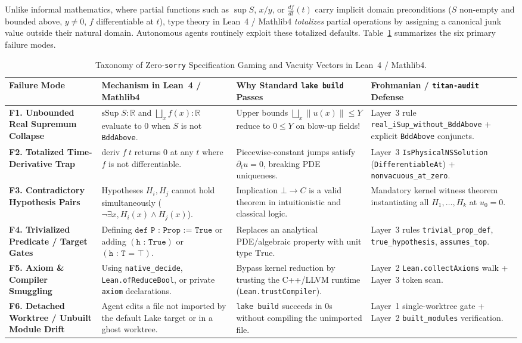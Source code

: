 \documentclass[11pt,a4paper]{article}
\theoremstyle{plain}
\theoremstyle{definition}
\begin{document}
Unlike informal mathematics, where partial functions such as $\sup S$, $x/y$, or $\frac{df}{dt}(t)$ carry implicit domain preconditions ($S$ non-empty and bounded above, $y \ne 0$, $f$ differentiable at $t$), type theory in Lean~4 / Mathlib4 \emph{totalizes} partial operations by assigning a canonical junk value outside their natural domain. Autonomous agents routinely exploit these totalized defaults. Table~\ref{tab:taxonomy} summarizes the six primary failure modes.

\begin{table}[htbp]
\centering
\caption{Taxonomy of Zero-\texttt{sorry} Specification Gaming and Vacuity Vectors in Lean~4 / Mathlib4.}
\label{tab:taxonomy}
\renewcommand{\arraystretch}{1.25}
\footnotesize
\begin{tabular}{@{}p{2.9cm}p{4.3cm}p{4.2cm}p{3.4cm}@{}}
\toprule
\textbf{Failure Mode} & \textbf{Mechanism in Lean~4 / Mathlib4} & \textbf{Why Standard \texttt{lake build} Passes} & \textbf{Frohmanian / \texttt{titan-audit} Defense} \\
\midrule
\textbf{F1. Unbounded Real Supremum Collapse} & $\mathrm{sSup}\;S : \mathbb{R}$ and $\bigsqcup_x f(x) : \mathbb{R}$ evaluate to $0$ when $S$ is not \texttt{BddAbove}. & Upper bounds $\bigsqcup_x \|u(x)\| \le Y$ reduce to $0 \le Y$ on blow-up fields! & Layer~3 rule \texttt{real\_iSup\_without\_BddAbove} + explicit \texttt{BddAbove} conjuncts. \\
\textbf{F2. Totalized Time-Derivative Trap} & $\mathrm{deriv}\;f\;t$ returns $0$ at any $t$ where $f$ is not differentiable. & Piecewise-constant jumps satisfy $\partial_t u = 0$, breaking PDE uniqueness. & Layer~3 \texttt{IsPhysicalNSSolution} (\texttt{DifferentiableAt}) + \texttt{nonvacuous\_at\_zero}. \\
\textbf{F3. Contradictory Hypothesis Pairs} & Hypotheses $H_i, H_j$ cannot hold simultaneously ($\neg\exists x, H_i(x)\land H_j(x)$). & Implication $\bot \to C$ is a valid theorem in intuitionistic and classical logic. & Mandatory kernel witness theorem instantiating all $H_1,\dots,H_k$ at $u_0=0$. \\
\textbf{F4. Trivialized Predicate / Target Gates} & Defining $\texttt{def P : Prop := True}$ or adding $(\texttt{h : True})$ or $(\texttt{h : T = }\top)$. & Replaces an analytical PDE/algebraic property with unit type $\mathrm{True}$. & Layer~3 rules \texttt{trivial\_prop\_def}, \texttt{true\_hypothesis}, \texttt{assumes\_top}. \\
\textbf{F5. Axiom \& Compiler Smuggling} & Using \texttt{native\_decide}, \texttt{Lean.ofReduceBool}, or private \texttt{axiom} declarations. & Bypass kernel reduction by trusting the C++/LLVM runtime (\texttt{Lean.trustCompiler}). & Layer~2 \texttt{Lean.collectAxioms} walk + Layer~3 token scan. \\
\textbf{F6. Detached Worktree / Unbuilt Module Drift} & Agent edits a file not imported by the default Lake target or in a ghost worktree. & \texttt{lake build} succeeds in 0s without compiling the unimported file. & Layer~1 single-worktree gate + Layer~2 \texttt{built\_modules} verification. \\
\bottomrule
\end{tabular}
\end{table}
\end{document}
